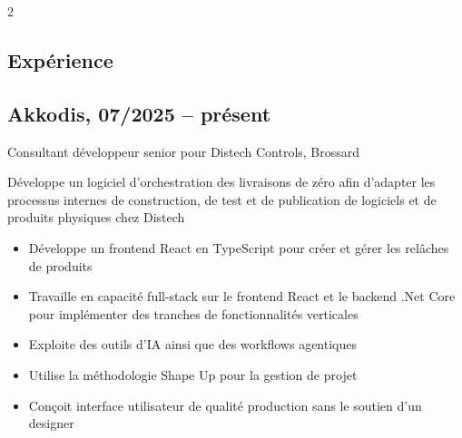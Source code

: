 \documentclass{article}
\begin{document}
\begin{paracol}{2}
\begin{rightcolumn}
    \section{Expérience}

    \subsection{Akkodis, 07/2025 -- présent}
    {Consultant développeur senior pour Distech Controls, Brossard\par}
    {
      Développe un logiciel d'orchestration des livraisons de zéro afin d'adapter les processus internes
      de construction, de test et de publication de logiciels et de produits physiques chez Distech
    \par}
    \begin{itemize}
      \item Développe un frontend React en TypeScript pour créer et gérer les relâches de produits
      \item Travaille en capacité full-stack sur le frontend React et le backend .Net Core pour implémenter des tranches de fonctionnalités verticales
      \item Exploite des outils d'IA ainsi que des workflows agentiques
      \item Utilise la méthodologie Shape Up pour la gestion de projet
      \item Conçoit interface utilisateur de qualité production sans le soutien d'un designer
    \end{itemize}

    \vspace{1em}


\end{rightcolumn}
\end{paracol}
\end{document}
